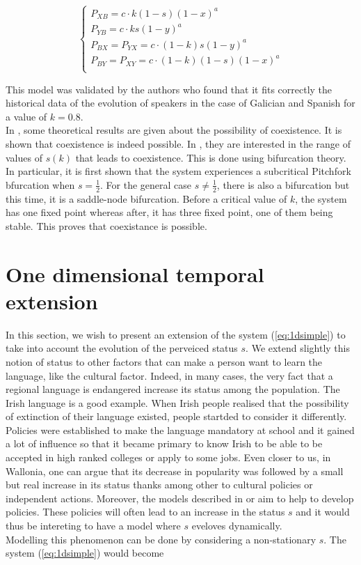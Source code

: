 \documentclass{article}
\begin{document}
\[
\begin{cases}
P_{XB} = c \cdot k (1-s) (1-x)^a \\
P_{YB} = c \cdot k s (1-y)^a \\
P_{BX} = P_{YX} = c \cdot (1-k) s (1-y)^a \\
P_{BY} = P_{XY} = c \cdot (1-k) (1-s) (1-x)^a \\
\end{cases}
\]

This model was validated by the authors who found that it fits correctly the historical data of the evolution of speakers in the case of Galician and Spanish for a value of $k = 0.8$. \\
In \cite{BAGGS19939}, some theoretical results are given about the possibility of coexistence. It is shown that coexistence is indeed possible. In \cite{bilingual}, they are interested in the range of values of $s(k)$ that leads to coexistence. This is done using bifurcation theory. In particular, it is first shown that the system experiences a subcritical Pitchfork bfurcation when $s = \frac{1}{2}$. For the general case $s \ne \frac{1}{2}$, there is also a bifurcation but this time, it is a saddle-node bifurcation. Before a critical value of $k$, the system has one fixed point whereas after, it has three fixed point, one of them being stable. This proves that coexistance is possible.

\section{One dimensional temporal extension}
\label{sec:1d}
In this section, we wish to present an extension of the system (\ref{eq:1dsimple}) to take into account the evolution of the perveiced status $s$.
We extend slightly this notion of status to other factors that can make a person want to learn the language, like the cultural factor.
Indeed, in many cases, the very fact that a regional language is endangered increase its status among the population.
The Irish language is a good example.
When Irish people realised that the possibility of extinction of their language existed, people startded to consider it differently.
Policies were established to make the language mandatory at school and it gained a lot of influence so that it became primary to know Irish to be able to be accepted in high ranked colleges or apply to some jobs.
Even closer to us, in Wallonia, one can argue that its decrease in popularity was followed by a small but real increase in its status thanks among other to cultural policies or independent actions.
Moreover, the models described in \cite{death} or \cite{bilingual} aim to help to develop policies.
These policies will often lead to an increase in the status $s$ and it would thus be intereting to have a model where $s$ eveloves dynamically. \\
Modelling this phenomenon can be done by considering a non-stationary $s$. The system (\ref{eq:1dsimple}) would become
\end{document}
